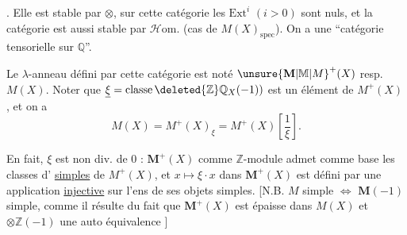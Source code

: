 . Elle est stable par $\otimes$, sur cette catégorie les $\mathrm{Ext}^i$ $(i>0)$ sont nuls, et la catégorie est aussi stable par $\mathscr{H}\mathrm{om}$. (cas de $M(X)_{\mathrm{spec}}$). On a une ``catégorie tensorielle  sur $\mathbb Q$''.

Le  $\lambda$-anneau défini par cette catégorie est noté $\unsure{\mathbf M|\mathbb M|M}^+(X)$ resp. $M(X)$. Noter que $\underline{\xi}=\mathrm{classe}\,\deleted{\mathbb Z}\mathbb Q_X(-1))$ est un élément de $M^+(X)$, et on a
\[
M(X)=M^+(X)_\xi=M^+(X)\left[\frac{1}{\xi}\right].
\]

En fait, $\xi$ est non div. de $0$ : $\mathbf M^+(X)$ comme $\mathbb Z$-module admet comme base les classes d' \uline{simples} de $M^+(X)$, et $x\mapsto\xi\cdot x$ dans $\mathbf M^+(X)$ est défini par une application \uline{injective} sur l'ens de ses objets simples. [N.B. $M$ simple  $\Longleftrightarrow$  $\mathbf M(-1)$ simple, comme il résulte du fait que $\mathbf M^+(X)$ est épaisse dans $M(X)$ et $\otimes\mathbb Z(-1)$ une auto équivalence ]
